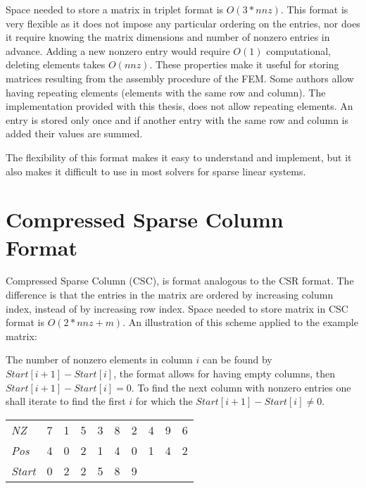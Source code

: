 Space needed to store a matrix in triplet format is $O(3*nnz)$. This format is very flexible as it does not impose any particular ordering on the entries, nor does it require knowing the matrix dimensions and number of nonzero entries in advance. Adding a new nonzero entry would require $O(1)$ computational, deleting elements takes $O(nnz)$. These properties make it useful for storing matrices resulting from the assembly procedure of the FEM. Some authors \cite{davis-sparse} allow having repeating elements (elements with the same row and column). The implementation provided with this thesis, does not allow repeating elements. An entry is stored only once and if another entry with the same row and column is added their values are summed.

The flexibility of this format makes it easy to understand and implement, but it also makes it difficult to use in most solvers for sparse linear systems.

\section{Compressed Sparse Column Format}
Compressed Sparse Column (CSC), is format analogous to the CSR format. The difference is that the entries in the matrix are ordered by increasing column index, instead of by increasing row index. Space needed to store matrix in CSC format is $O(2*nnz + m)$. An illustration of this scheme applied to the example matrix:

The number of nonzero elements in column $i$ can be found by $Start[i+1] - Start[i]$, the format allows for having empty columns, then $Start[i+1] - Start[i] = 0$. To find the next column with nonzero entries one shall iterate to find the first $i$ for which the $Start[i+1] - Start[i] \neq 0$.

\begin{table}[h]
	\centering
	\begin{tabular}{l|ccccccccc}
		\cline{2-10}
		\textit{NZ}    & 7 & 1 & 5 & 3 & 8 & 2                      & 4 & 9 & \multicolumn{1}{c|}{6} \\ \cline{2-10}
		\textit{Pos}   & 4 & 0 & 2 & 1 & 4 & 0                      & 1 & 4 & \multicolumn{1}{c|}{2} \\ \cline{2-10}
		\textit{Start} & 0 & 2 & 2 & 5 & 8 & \multicolumn{1}{c|}{9} &   &   &                        \\ \cline{2-7}
	\end{tabular}
\end{table}

